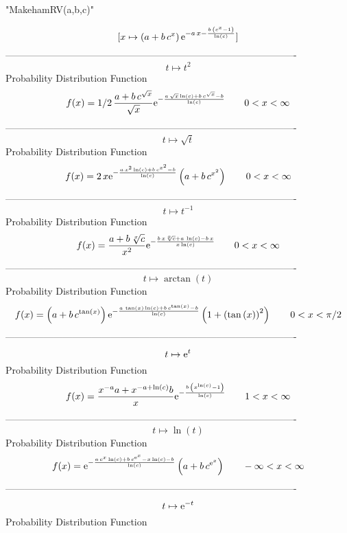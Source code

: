 \documentclass[12pt]{article}
\begin{document}
 
                             "MakehamRV(a,b,c)"

$$[x\mapsto  \left( a+b\,{c}^{x} \right) {{\rm e}^{-a\,x-{\frac {b\,
 \left( {c}^{x}-1 \right) }{\ln  \left( c \right) }}}}]
$$-------------------------------------------------------------------------------------------  \\$$t\mapsto {t}^{2}
$$Probability Distribution Function 
$$  f(x)=1/2\,{\frac {a+b\,{c}^{\sqrt {x}}}{\sqrt {x}}{{\rm e}^{-{\frac {a\,
\sqrt {x}\ln  \left( c \right) +b\,{c}^{\sqrt {x}}-b}{\ln  \left( c
 \right) }}}}}
 \qquad0
 < x < \infty 
$$-------------------------------------------------------------------------------------------  \\$$t\mapsto \sqrt {t}
$$Probability Distribution Function 
$$  f(x)=2\,x{{\rm e}^{-{\frac {a\,{x}^{2}\ln  \left( c \right) +b\,{c}^{{x}^{2
}}-b}{\ln  \left( c \right) }}}} \left( a+b\,{c}^{{x}^{2}} \right) 
 \qquad0
 < x < \infty 
$$-------------------------------------------------------------------------------------------  \\$$t\mapsto {t}^{-1}
$$Probability Distribution Function 
$$  f(x)={\frac {a+b\,\sqrt [x]{c}}{{x}^{2}}{{\rm e}^{-{\frac {b\,x\sqrt [x]{c}
+a\,\ln  \left( c \right) -b\,x}{x\ln  \left( c \right) }}}}}
 \qquad0
 < x < \infty 
$$-------------------------------------------------------------------------------------------  \\$$t\mapsto \arctan \left( t \right) 
$$Probability Distribution Function 
$$  f(x)= \left( a+b\,{c}^{\tan \left( x \right) } \right) {{\rm e}^{-{\frac {a
\,\tan \left( x \right) \ln  \left( c \right) +b\,{c}^{\tan \left( x
 \right) }-b}{\ln  \left( c \right) }}}} \left( 1+ \left( \tan \left( 
x \right)  \right) ^{2} \right) 
 \qquad0
 < x < \pi/2
$$-------------------------------------------------------------------------------------------  \\$$t\mapsto {{\rm e}^{t}}
$$Probability Distribution Function 
$$  f(x)={\frac {{x}^{-a}a+{x}^{-a+\ln  \left( c \right) }b}{x}{{\rm e}^{-{
\frac {b\, \left( {x}^{\ln  \left( c \right) }-1 \right) }{\ln 
 \left( c \right) }}}}}
 \qquad1
 < x < \infty 
$$-------------------------------------------------------------------------------------------  \\$$t\mapsto \ln  \left( t \right) 
$$Probability Distribution Function 
$$  f(x)={{\rm e}^{-{\frac {a\,{{\rm e}^{x}}\ln  \left( c \right) +b\,{c}^{{
{\rm e}^{x}}}-x\ln  \left( c \right) -b}{\ln  \left( c \right) }}}}
 \left( a+b\,{c}^{{{\rm e}^{x}}} \right) 
 \qquad-\infty 
 < x < \infty 
$$-------------------------------------------------------------------------------------------  \\$$t\mapsto {{\rm e}^{-t}}
$$Probability Distribution Function 
\end{document}
